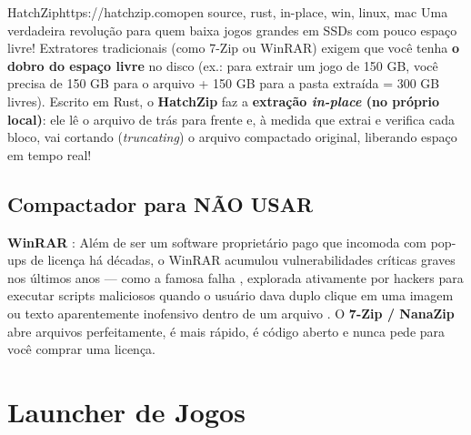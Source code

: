 \documentclass{pousadaguide}
\begin{document}
\begin{ferramenta}[goat,logo=hatchzip]{HatchZip}{https://hatchzip.com}{open source, rust, in-place, win, linux, mac}
Uma verdadeira revolução para quem baixa jogos grandes em SSDs com pouco espaço livre! Extratores tradicionais (como 7-Zip ou WinRAR) exigem que você tenha \textbf{o dobro do espaço livre} no disco (ex.: para extrair um jogo de 150 GB, você precisa de 150 GB para o arquivo  + 150 GB para a pasta extraída = 300 GB livres). Escrito em Rust, o \textbf{HatchZip} faz a \textbf{extração \emph{in-place} (no próprio local)}: ele lê o arquivo de trás para frente e, à medida que extrai e verifica cada bloco, vai cortando (\emph{truncating}) o arquivo compactado original, liberando espaço em tempo real! 
\end{ferramenta}


\subsection{Compactador para NÃO USAR}

\begin{atencao}
\textbf{WinRAR} : Além de ser um software proprietário pago que incomoda com pop-ups de licença há décadas, o WinRAR acumulou vulnerabilidades críticas graves nos últimos anos — como a famosa falha , explorada ativamente por hackers para executar scripts maliciosos quando o usuário dava duplo clique em uma imagem ou texto aparentemente inofensivo dentro de um arquivo . O \textbf{7-Zip / NanaZip} abre arquivos  perfeitamente, é mais rápido, é código aberto e nunca pede para você comprar uma licença.
\end{atencao}

\section{Launcher de Jogos}
\end{document}
